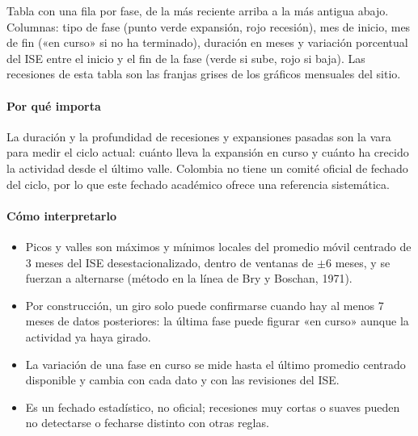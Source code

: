 \begin{leer}
Tabla con una fila por fase, de la más reciente arriba a la más antigua abajo. Columnas: tipo de fase (punto verde expansión, rojo recesión), mes de inicio, mes de fin («en curso» si no ha terminado), duración en meses y variación porcentual del ISE entre el inicio y el fin de la fase (verde si sube, rojo si baja). Las recesiones de esta tabla son las franjas grises de los gráficos mensuales del sitio.
\end{leer}

\paragraph{Por qué importa}
La duración y la profundidad de recesiones y expansiones pasadas son la vara para medir el ciclo actual: cuánto lleva la expansión en curso y cuánto ha crecido la actividad desde el último valle. Colombia no tiene un comité oficial de fechado del ciclo, por lo que este fechado académico ofrece una referencia sistemática.

\paragraph{Cómo interpretarlo}
\begin{itemize}
\item Picos y valles son máximos y mínimos locales del promedio móvil centrado de 3 meses del ISE desestacionalizado, dentro de ventanas de $\pm$6 meses, y se fuerzan a alternarse (método en la línea de Bry y Boschan, 1971).
\item Por construcción, un giro solo puede confirmarse cuando hay al menos 7 meses de datos posteriores: la última fase puede figurar «en curso» aunque la actividad ya haya girado.
\item La variación de una fase en curso se mide hasta el último promedio centrado disponible y cambia con cada dato y con las revisiones del ISE.
\item Es un fechado estadístico, no oficial; recesiones muy cortas o suaves pueden no detectarse o fecharse distinto con otras reglas.
\end{itemize}
\begin{formulas}[Fórmulas]
\end{formulas}

